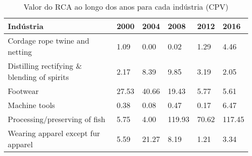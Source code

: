 \begin{table}
\centering
\caption{Valor do RCA ao longo dos anos para cada indústria (CPV)}
\label{tab:ex3-tempo-CPV}
\begin{tabular}{p{6cm}p{1.5cm}p{1.5cm}p{1.5cm}p{1.5cm}p{1.5cm}}
\toprule
                                  Indústria &  2000 &  2004 &   2008 &  2012 &   2016 \\
\midrule
             Cordage rope twine and netting &  1.09 &  0.00 &   0.02 &  1.29 &   4.46 \\
Distilling rectifying \& blending of spirits &  2.17 &  8.39 &   9.85 &  3.19 &   2.05 \\
                                   Footwear & 27.53 & 40.66 &  19.43 &  5.77 &   5.61 \\
                              Machine tools &  0.38 &  0.08 &   0.47 &  0.17 &   6.47 \\
              Processing/preserving of fish &  5.75 &  4.00 & 119.93 & 70.62 & 117.45 \\
         Wearing apparel except fur apparel &  5.59 & 21.27 &   8.19 &  1.21 &   3.34 \\
\bottomrule
\end{tabular}
\end{table}
